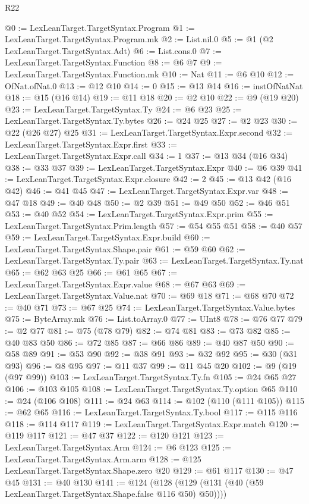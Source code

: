 \begin{lexlean}{R22}
\begin{coremodule}
@0 := LexLeanTarget.TargetSyntax.Program
@1 := LexLeanTarget.TargetSyntax.Program.mk
@2 := List.nil.{0}
@5 := @1 (@2 LexLeanTarget.TargetSyntax.Adt)
@6 := List.cons.{0}
@7 := LexLeanTarget.TargetSyntax.Function
@8 := @6 @7
@9 := LexLeanTarget.TargetSyntax.Function.mk
@10 := Nat
@11 := @6 @10
@12 := OfNat.ofNat.{0}
@13 := @12 @10
@14 := 0
@15 := @13 @14
@16 := instOfNatNat
@18 := @15 (@16 @14)
@19 := @11 @18
@20 := @2 @10
@22 := @9 (@19 @20)
@23 := LexLeanTarget.TargetSyntax.Ty
@24 := @6 @23
@25 := LexLeanTarget.TargetSyntax.Ty.bytes
@26 := @24 @25
@27 := @2 @23
@30 := @22 (@26 @27) @25
@31 := LexLeanTarget.TargetSyntax.Expr.second
@32 := LexLeanTarget.TargetSyntax.Expr.first
@33 := LexLeanTarget.TargetSyntax.Expr.call
@34 := 1
@37 := @13 @34 (@16 @34)
@38 := @33 @37
@39 := LexLeanTarget.TargetSyntax.Expr
@40 := @6 @39
@41 := LexLeanTarget.TargetSyntax.Expr.closure
@42 := 2
@45 := @13 @42 (@16 @42)
@46 := @41 @45
@47 := LexLeanTarget.TargetSyntax.Expr.var
@48 := @47 @18
@49 := @40 @48
@50 := @2 @39
@51 := @49 @50
@52 := @46 @51
@53 := @40 @52
@54 := LexLeanTarget.TargetSyntax.Expr.prim
@55 := LexLeanTarget.TargetSyntax.Prim.length
@57 := @54 @55 @51
@58 := @40 @57
@59 := LexLeanTarget.TargetSyntax.Expr.build
@60 := LexLeanTarget.TargetSyntax.Shape.pair
@61 := @59 @60
@62 := LexLeanTarget.TargetSyntax.Ty.pair
@63 := LexLeanTarget.TargetSyntax.Ty.nat
@65 := @62 @63 @25
@66 := @61 @65
@67 := LexLeanTarget.TargetSyntax.Expr.value
@68 := @67 @63
@69 := LexLeanTarget.TargetSyntax.Value.nat
@70 := @69 @18
@71 := @68 @70
@72 := @40 @71
@73 := @67 @25
@74 := LexLeanTarget.TargetSyntax.Value.bytes
@75 := ByteArray.mk
@76 := List.toArray.{0}
@77 := UInt8
@78 := @76 @77
@79 := @2 @77
@81 := @75 (@78 @79)
@82 := @74 @81
@83 := @73 @82
@85 := @40 @83 @50
@86 := @72 @85
@87 := @66 @86
@89 := @40 @87 @50
@90 := @58 @89
@91 := @53 @90
@92 := @38 @91
@93 := @32 @92
@95 := @30 (@31 @93)
@96 := @8 @95
@97 := @11 @37
@99 := @11 @45 @20
@102 := @9 (@19 (@97 @99))
@103 := LexLeanTarget.TargetSyntax.Ty.fn
@105 := @24 @65 @27
@106 := @103 @105
@108 := LexLeanTarget.TargetSyntax.Ty.option @65
@110 := @24 (@106 @108)
@111 := @24 @63
@114 := @102 (@110 (@111 @105))
@115 := @62 @65
@116 := LexLeanTarget.TargetSyntax.Ty.bool
@117 := @115 @116
@118 := @114 @117
@119 := LexLeanTarget.TargetSyntax.Expr.match
@120 := @119 @117
@121 := @47 @37
@122 := @120 @121
@123 := LexLeanTarget.TargetSyntax.Arm
@124 := @6 @123
@125 := LexLeanTarget.TargetSyntax.Arm.arm
@128 := @125 LexLeanTarget.TargetSyntax.Shape.zero @20
@129 := @61 @117
@130 := @47 @45
@131 := @40 @130
@141 := @124 (@128 (@129 (@131 (@40 (@59 LexLeanTarget.TargetSyntax.Shape.false @116 @50) @50))))

\end{coremodule}
\end{lexlean}
